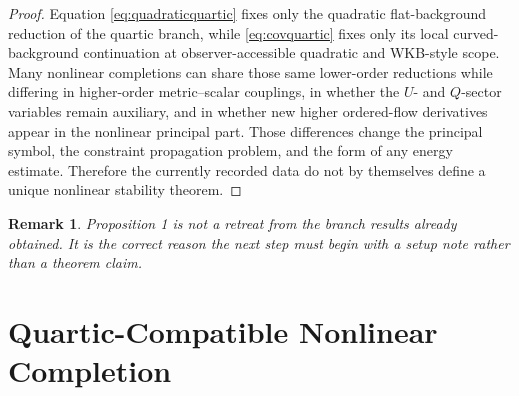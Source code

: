 \documentclass[11pt]{article}
\newtheorem{remark}{Remark}
\begin{document}
\begin{proof}
Equation \eqref{eq:quadraticquartic} fixes only the quadratic flat-background reduction of the quartic branch, while \eqref{eq:covquartic} fixes only its local curved-background continuation at observer-accessible quadratic and WKB-style scope. Many nonlinear completions can share those same lower-order reductions while differing in higher-order metric--scalar couplings, in whether the \(U\)- and \(Q\)-sector variables remain auxiliary, and in whether new higher ordered-flow derivatives appear in the nonlinear principal part. Those differences change the principal symbol, the constraint propagation problem, and the form of any energy estimate. Therefore the currently recorded data do not by themselves define a unique nonlinear stability theorem.
\end{proof}

\begin{remark}
Proposition 1 is not a retreat from the branch results already obtained. It is the correct reason the next step must begin with a setup note rather than a theorem claim.
\end{remark}

\section{Quartic-Compatible Nonlinear Completion}
\end{document}
